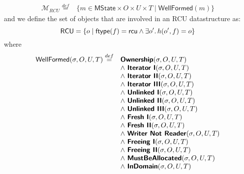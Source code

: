 \[
\begin{array}{cl}
\mathcal{M}_{RCU} \stackrel{def}{=} &\{ m \in \textsf{MState} \times O \times U \times T \mid  \textsf{WellFormed}( m) \}
\end{array}
\]
and we define the set of objects that are involved in an RCU datastructure as:
\[
\textsf{RCU} =  
\{ o \mid \textsf{ftype}(f) = \textsf{rcu} \land \exists o' \ldotp h(o',f) = o \}
\]
where
\[
\begin{array}{cl}
\textsf{WellFormed}(\sigma,O,U,T) \stackrel{def}{=} 		&\textbf{\textsf{Ownership}}(\sigma,O,U,T)\\
								&\land$ $\textbf{\textsf{Iterator I}}(\sigma,O,U,T)\\
								&\land$ $\textbf{\textsf{Iterator II}}(\sigma,O,U,T)\\
								&\land$ $\textbf{\textsf{Iterator III}}(\sigma,O,U,T)\\
								&\land$ $\textbf{\textsf{Unlinked I}}(\sigma,O,U,T)\\
								&\land$ $\textbf{\textsf{Unlinked II}}(\sigma,O,U,T)\\	
								&\land$ $\textbf{\textsf{Unlinked III}}(\sigma,O,U,T)\\					
								&\land$ $\textbf{\textsf{Fresh I}}(\sigma,O,U,T)\\
								&\land$ $\textbf{\textsf{Fresh II}}(\sigma,O,U,T)\\
								&\land$ $\textbf{\textsf{Writer Not Reader}}(\sigma,O,U,T)\\
								&\land$ $\textbf{\textsf{Freeing I}}(\sigma,O,U,T)\\
								&\land$ $\textbf{\textsf{Freeing II}}(\sigma,O,U,T)\\
								&\land$ $\textbf{\textsf{MustBeAllocated}}(\sigma,O,U,T)\\
								&\land$ $\textbf{\textsf{InDomain}}(\sigma,O,U,T)\\
\end{array}
\]


